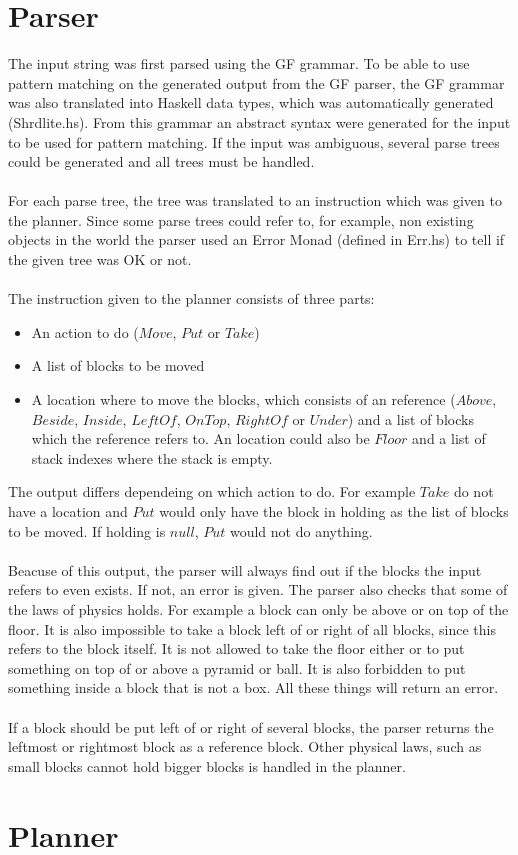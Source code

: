 \section{Parser}
The input string was first parsed using the GF grammar. To be able to use pattern matching on the generated output from the GF parser, the GF grammar was also translated into Haskell data types, which was automatically generated (Shrdlite.hs). From this grammar an abstract syntax were generated for the input to be used for pattern matching. If the input was ambiguous, several parse trees could be generated and all trees must be handled. \\\\
For each parse tree, the tree was translated to an instruction which was given to the planner. Since some parse trees could refer to, for example, non existing objects in the world the parser used an Error Monad (defined in Err.hs) to tell if the given tree was OK or not. \\\\
The instruction given to the planner consists of three parts:
\begin{itemize}
\item An action to do ($Move$, $Put$ or $Take$)
\item A list of blocks to be moved
\item A location where to move the blocks, which consists of an reference ($Above$, $Beside$, $Inside$, $LeftOf$, $OnTop$, $RightOf$ or $Under$) and a list of blocks which the reference refers to. An location could also be $Floor$ and a list of stack indexes where the stack is empty.
\end{itemize}
The output differs dependeing on which action to do. For example $Take$ do not have a location and $Put$ would only have the block in holding as the list of blocks to be moved. If holding is $null$, $Put$ would not do anything.\\\\
Beacuse of this output, the parser will always find out if the blocks the input refers to even exists. If not, an error is given. The parser also checks that some of the laws of physics holds. For example a block can only be above or on top of the floor. It is also impossible to take a block left of or right of all blocks, since this refers to the block itself. It is not allowed to take the floor either or to put something on top of or above a pyramid or ball. It is also forbidden to put something inside a block that is not a box. All these things will return an error. \\\\
If a block should be put left of or right of several blocks, the parser returns the leftmost or rightmost block as a reference block. Other physical laws, such as small blocks cannot hold bigger blocks is handled in the planner.

\section{Planner}


